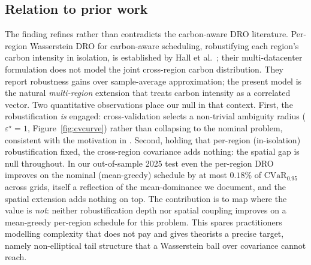 \documentclass[12pt]{article}
\newcommand{\CVaR}{\mathrm{CVaR}}
\begin{document}
\subsection{Relation to prior work}
The finding refines rather than contradicts the carbon-aware DRO literature.
Per-region Wasserstein DRO for carbon-aware scheduling, robustifying each region's
carbon intensity in isolation, is established by
Hall et al.~\citep{hall2024}; their multi-datacenter formulation does not model the
joint cross-region carbon distribution. They report robustness gains over
sample-average approximation; the present model is the natural \emph{multi-region}
extension that treats carbon intensity as a correlated vector. Two quantitative
observations place our null in that context. First, the robustification \emph{is}
engaged: cross-validation selects a non-trivial ambiguity radius
($\varepsilon^\star=1$, Figure~\ref{fig:cvcurve}) rather than collapsing to the
nominal problem, consistent with the motivation in \citep{hall2024}. Second, holding
that per-region (in-isolation) robustification fixed, the cross-region covariance adds
nothing: the spatial gap is null throughout. In our out-of-sample 2025 test
even the per-region DRO improves on the nominal (mean-greedy) schedule by at most $0.18\%$
of $\CVaR_{0.95}$ across grids, itself a reflection of the mean-dominance we
document, and the spatial extension adds nothing on top. The contribution is to
map where the value is \emph{not}: neither robustification depth nor spatial
coupling improves on a mean-greedy per-region schedule for this problem.
This spares practitioners modelling complexity that does not pay and gives
theorists a precise target, namely non-elliptical tail
structure that a Wasserstein ball over covariance cannot reach.
\end{document}

